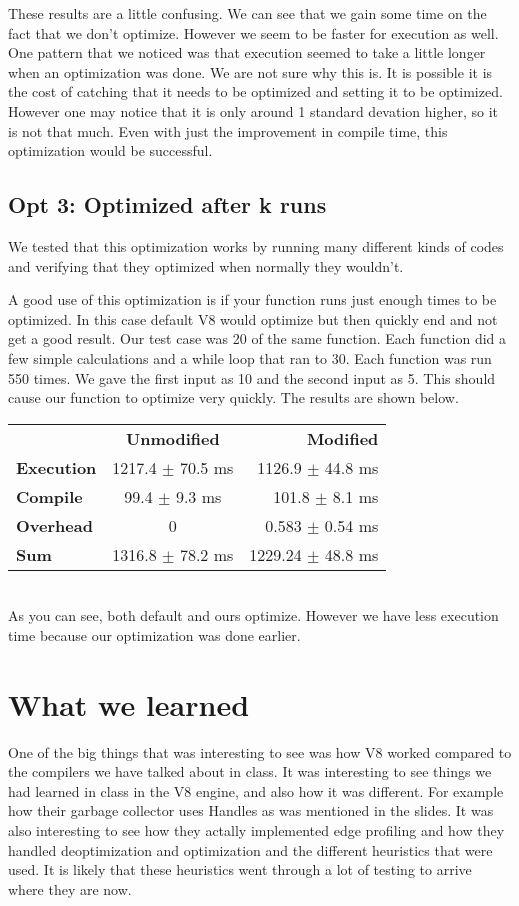 \documentclass[twocolumn,showpacs,%
  nofootinbib,aps,superscriptaddress,%
  eqsecnum,prd,notitlepage,showkeys,10pt]{revtex4-1}
\begin{document}
These results are a little confusing. We can see that we gain some time on the fact that we don't optimize. However we seem to be faster for execution as well. One pattern that we noticed was that execution seemed to take a little longer when an optimization was done. We are not sure why this is. It is possible it is  the cost of catching that it needs to be optimized and setting it to be optimized. However one may notice that it is only around 1 standard devation higher, so it is not that much. Even with just the improvement in compile time, this optimization would be successful. 


\subsection{Opt 3: Optimized after k runs}
We tested that this optimization works by running many different kinds of codes and verifying that they optimized when normally they wouldn't. 

A good use of this optimization is if your function runs just enough times to be optimized. In this case default V8 would optimize but then quickly end and not get a good result. Our test case was 20 of the same function. Each function did a few simple calculations and a while loop that ran to 30. Each function was run 550 times. We gave the first input as 10 and the second input as 5. This should cause our function to optimize very quickly. The results are shown below.

\begin{tabular}{ l c r }
  & \textbf{Unmodified} & \textbf{Modified} \\
\textbf{Execution} &  1217.4  $\pm$  70.5 ms &  1126.9  $\pm$  44.8 ms \\
\textbf{Compile} & 99.4  $\pm$  9.3 ms & 101.8  $\pm$  8.1 ms \\
\textbf{Overhead} &  0   &   0.583  $\pm$  0.54 ms  \\
\textbf{Sum} & 1316.8  $\pm$  78.2 ms & 1229.24  $\pm$  48.8 ms \\
\end{tabular}\\

As you can see, both default and ours optimize. However we have less execution time because our optimization was done earlier.




\section {What we learned}
One of the big things that was interesting to see was how V8 worked compared to the compilers we have talked about in class. It was interesting to see things we had learned in class in the V8 engine, and also how it was different. For example how their garbage collector uses Handles as was mentioned in the slides. It was also interesting to see how they actally implemented edge profiling and how they handled deoptimization and optimization and the different heuristics that were used. It is likely that these heuristics went through a lot of testing to arrive where they are now.
\end{document}
